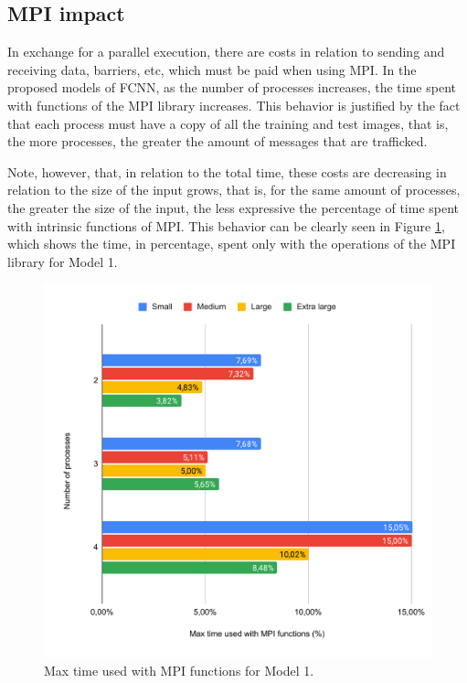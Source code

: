 \documentclass[conference]{IEEEtran}
\begin{document}
\subsection{MPI impact}

In exchange for a parallel execution, there are costs in relation to sending and receiving data, barriers, etc, which must be paid when using MPI. In the proposed models of FCNN, as the number of processes increases, the time spent with functions of the MPI library increases. This behavior is justified by the fact that each process must have a copy of all the training and test images, that is, the more processes, the greater the amount of messages that are trafficked.

Note, however, that, in relation to the total time, these costs are decreasing in relation to the size of the input grows, that is, for the same amount of processes, the greater the size of the input, the less expressive the percentage of time spent with intrinsic functions of MPI. This behavior can be clearly seen in Figure \ref{fig:mpimaxtime}, which shows the time, in percentage, spent only with the operations of the MPI library for Model 1.

\begin{figure}
    \centering
    \includegraphics[width=\columnwidth]{images/mpi-max-time.pdf}
    \caption{Max time used with MPI functions for Model 1.}
    \label{fig:mpimaxtime}
\end{figure}
\end{document}
